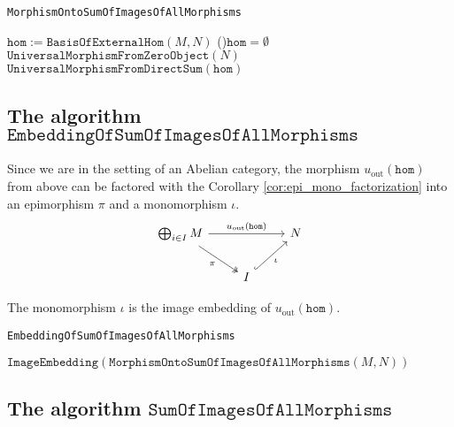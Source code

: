 \begin{algorithm}[H]\capstart
    \caption{\texttt{MorphismOntoSumOfImagesOfAllMorphisms}}\label{algo:MorphismOntoSumOfImagesOfAllMorphisms}
	\BlankLine
	$\mathtt{hom} := \mathtt{BasisOfExternalHom}( M, N )$\;
	\If(){$\mathtt{hom} = \emptyset$}{
	    \Return $\mathtt{UniversalMorphismFromZeroObject}( N )$\;
	}
	\BlankLine
	\Return $\mathtt{UniversalMorphismFromDirectSum}( \mathtt{hom} )$\;
\end{algorithm}

\subsection{The algorithm $\mathtt{EmbeddingOfSumOfImagesOfAllMorphisms}$}

Since we are in the setting of an Abelian category, the morphism $u_{\text{out}}(\mathtt{hom})$ from above can
be factored with the Corollary \ref{cor:epi_mono_factorization} into an epimorphism $\pi$ and a monomorphism $\iota$.
\[
\begin{tikzcd}
\bigoplus_{i\in I} M \arrow[rr, "u_{\text{out}}(\mathtt{hom})"] \arrow[rd, "\pi"', two heads] &                              & N \\
                                                                                              & I \arrow[ru, "\iota"', hook] &  
\end{tikzcd}
\]

The monomorphism $\iota$ is the image embedding of $u_{\text{out}}(\mathtt{hom})$.

\begin{algorithm}[H]\capstart
    \caption{\texttt{EmbeddingOfSumOfImagesOfAllMorphisms}}\label{algo:EmbeddingOfSumOfImagesOfAllMorphisms}
	\BlankLine
	\Return $\mathtt{ImageEmbedding}( \mathtt{MorphismOntoSumOfImagesOfAllMorphisms}( M, N ) )$\;
\end{algorithm}

\subsection{The algorithm $\mathtt{SumOfImagesOfAllMorphisms}$}

